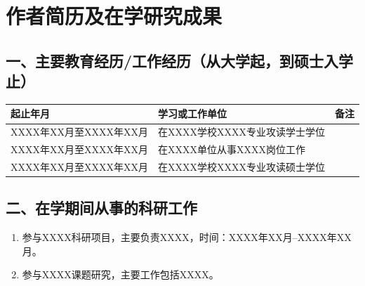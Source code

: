 


\chapter*{作者简历及在学研究成果}

\section*{一、主要教育经历/工作经历（从大学起，到硕士入学止）}

\begin{table}[hbt]
  \centering
  \renewcommand{\arraystretch}{1.3}
  \begin{tabular}{|p{}|p{}|p{}|}
    \hline
    \centering 起止年月 & \centering 学习或工作单位 & \centering 备注 \tabularnewline
    \hline
    \centering XXXX年XX月至XXXX年XX月 & 在XXXX学校XXXX专业攻读学士学位 & \tabularnewline
    \hline
    \centering XXXX年XX月至XXXX年XX月 & 在XXXX单位从事XXXX岗位工作 & \tabularnewline
    \hline
    \centering XXXX年XX月至XXXX年XX月 & 在XXXX学校XXXX专业攻读硕士学位 & \tabularnewline
    \hline
  \end{tabular}
\end{table}

\section*{二、在学期间从事的科研工作}

\begin{enumerate}[label={（\arabic*）}, leftmargin=3em, itemsep=0.5\baselineskip]
  \item 参与XXXX科研项目，主要负责XXXX，时间：XXXX年XX月--XXXX年XX月。
  \item 参与XXXX课题研究，主要工作包括XXXX。
\end{enumerate}

